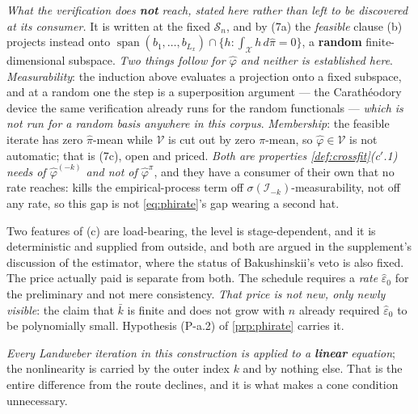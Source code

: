 \begin{definition}
\emph{What the verification does \textbf{not} reach, stated here rather than left to be discovered at
its consumer.} It is written at the fixed $\mathcal S_n$, and by
\textup{(7a)} the \emph{feasible} clause \textup{(b)} projects instead onto
$\operatorname{span}(b_1,\dots,b_{L_x})\cap\{h:\int_{\mathcal X}h\,d\hat\pi=0\}$, a \textbf{random}
finite-dimensional subspace. \emph{Two things follow for $\hat\varphi$ and neither is established
here}. \emph{Measurability}: the induction above evaluates a projection onto a fixed subspace, and at a
random one the step is a superposition argument --- the Carath\'eodory device the same verification
already runs for the random functionals  --- \emph{which is not run for a random basis
anywhere in this corpus}. \emph{Membership}: the feasible iterate has zero $\hat\pi$-mean while
$\mathcal V$ is cut out by zero $\pi$-mean, so $\hat\varphi\in\mathcal V$ is not automatic; that is
\textup{(7c)}, open and priced. \emph{Both are properties
\cref{def:crossfit}\textup{(c$'$.1)} needs of $\hat\varphi^{(-k)}$ and not of $\hat\varphi^{\pi}$}, and
they have a consumer of their own that no rate reaches:  kills the
empirical-process term off $\sigma(\mathcal I_{-k})$-measurability, not off any rate, so this gap is not
\eqref{eq:phirate}'s gap wearing a second hat.

Two features of \textup{(c)} are load-bearing, the level is stage-dependent, and it is
deterministic and supplied from outside, and both are argued in the supplement's discussion of the
estimator, where the status of Bakushinskii's veto is also fixed. The price actually paid is
separate from both. The schedule requires a \emph{rate}
$\hat\varepsilon_0$ for the preliminary and not mere consistency. \emph{That price is not new, only
newly visible}: the claim that $\bar k$ is finite and does not grow with $n$ already required
$\hat\varepsilon_0$ to be polynomially small. Hypothesis (P-a.2) of \cref{prp:phirate} carries it.

\emph{Every Landweber iteration in this construction is applied to a \textbf{linear} equation}; the
nonlinearity is carried by the outer index $k$ and by nothing else. That is the entire difference from
the route  declines, and it is what makes a cone condition unnecessary.
\end{definition}


